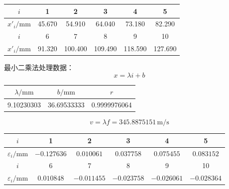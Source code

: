 \documentclass[a4paper,fontset=windows]{ctexart}
\begin{document}
    \vspace{0.5em}\begin{table}[ht!]\Large
        \begin{center}
            \begin{tabular}{ |c|c|c|c|c|c| }
                \hline
                $i$ & 1 & 2 & 3 & 4 & 5 \\
                \hline
                $x'_i/\mathrm{mm}$ & 45.670 & 54.910 & 64.040 & 73.180 & 82.290 \\
                \hline
                $i$ & 6 & 7 & 8 & 9 & 10 \\
                \hline
                $x'_i/\mathrm{mm}$ & 91.320 & 100.400 & 109.490 & 118.590 & 127.690 \\
                \hline
            \end{tabular}
        \end{center}
    \end{table}\vspace{-0.5em}

    最小二乘法处理数据：
    \[
    x = \lambda i+b
    \]

    \vspace{0.5em}\begin{table}[ht!]\Large
        \begin{center}
            \begin{tabular}{ |c|c|c| }
                \hline
                $\lambda/\mathrm{mm}$ & $b/\mathrm{mm}$ & $r$ \\
                \hline
                9.10230303 & 36.69533333 & 0.9999976064 \\
                \hline
            \end{tabular}
        \end{center}
    \end{table}\vspace{-2em}

    \[
    v = \lambda f = 345.8875151\,\mathrm{m/s}
    \]

    \vspace{0.5em}\begin{table}[ht!]\Large
        \begin{center}
            \begin{tabular}{ |c|c|c|c|c|c| }
                \hline
                $i$ & 1 & 2 & 3 & 4 & 5 \\
                \hline
                $\varepsilon_i/\mathrm{mm}$ & $-0.127636$ & $0.010061$ & $0.037758$ & $0.075455$ & $0.083152$ \\
                \hline
                $i$ & 6 & 7 & 8 & 9 & 10 \\
                \hline
                $\varepsilon_i/\mathrm{mm}$ & $0.010848$ & $-0.011455$ & $-0.023758$ & $-0.026061$ & $-0.028364$ \\
                \hline
            \end{tabular}
        \end{center}
    \end{table}
\end{document}
